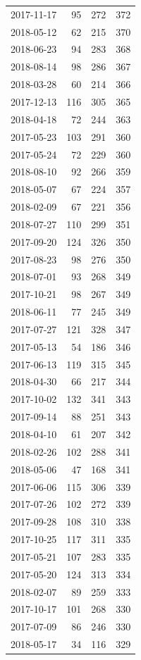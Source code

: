 \begin{tabular}{lrrr}
2017-11-17 & 95 & 272 & 372 \\
2018-05-12 & 62 & 215 & 370 \\
2018-06-23 & 94 & 283 & 368 \\
2018-08-14 & 98 & 286 & 367 \\
2018-03-28 & 60 & 214 & 366 \\
2017-12-13 & 116 & 305 & 365 \\
2018-04-18 & 72 & 244 & 363 \\
2017-05-23 & 103 & 291 & 360 \\
2017-05-24 & 72 & 229 & 360 \\
2018-08-10 & 92 & 266 & 359 \\
2018-05-07 & 67 & 224 & 357 \\
2018-02-09 & 67 & 221 & 356 \\
2018-07-27 & 110 & 299 & 351 \\
2017-09-20 & 124 & 326 & 350 \\
2017-08-23 & 98 & 276 & 350 \\
2018-07-01 & 93 & 268 & 349 \\
2017-10-21 & 98 & 267 & 349 \\
2018-06-11 & 77 & 245 & 349 \\
2017-07-27 & 121 & 328 & 347 \\
2017-05-13 & 54 & 186 & 346 \\
2017-06-13 & 119 & 315 & 345 \\
2018-04-30 & 66 & 217 & 344 \\
2017-10-02 & 132 & 341 & 343 \\
2017-09-14 & 88 & 251 & 343 \\
2018-04-10 & 61 & 207 & 342 \\
2018-02-26 & 102 & 288 & 341 \\
2018-05-06 & 47 & 168 & 341 \\
2017-06-06 & 115 & 306 & 339 \\
2017-07-26 & 102 & 272 & 339 \\
2017-09-28 & 108 & 310 & 338 \\
2017-10-25 & 117 & 311 & 335 \\
2017-05-21 & 107 & 283 & 335 \\
2017-05-20 & 124 & 313 & 334 \\
2018-02-07 & 89 & 259 & 333 \\
2017-10-17 & 101 & 268 & 330 \\
2017-07-09 & 86 & 246 & 330 \\
2018-05-17 & 34 & 116 & 329 \\

\end{tabular}
